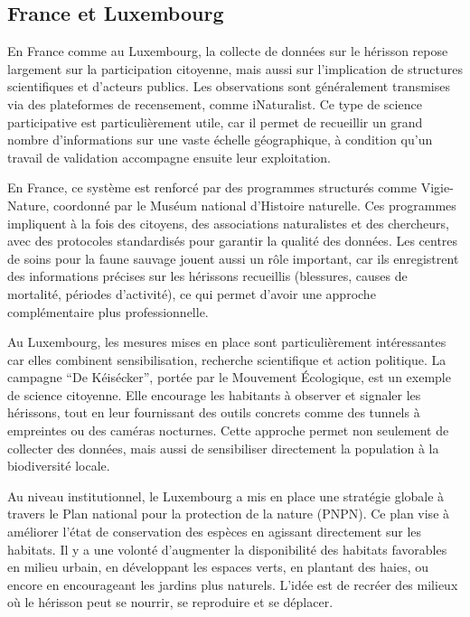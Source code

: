 \documentclass[a4paper,11pt]{article}
\begin{document}
\subsection{France et Luxembourg}

En France comme au Luxembourg, la collecte de données sur le hérisson repose largement sur la participation citoyenne, mais aussi sur l’implication de structures scientifiques et d’acteurs publics. Les observations sont généralement transmises via des plateformes de recensement, comme iNaturalist. Ce type de science participative est particulièrement utile, car il permet de recueillir un grand nombre d’informations sur une vaste échelle géographique, à condition qu’un travail de validation accompagne ensuite leur exploitation.

En France, ce système est renforcé par des programmes structurés comme Vigie-Nature, coordonné par le Muséum national d'Histoire naturelle. Ces programmes impliquent à la fois des citoyens, des associations naturalistes et des chercheurs, avec des protocoles standardisés pour garantir la qualité des données. Les centres de soins pour la faune sauvage jouent aussi un rôle important, car ils enregistrent des informations précises sur les hérissons recueillis (blessures, causes de mortalité, périodes d’activité), ce qui permet d’avoir une approche complémentaire plus professionnelle.

Au Luxembourg, les mesures mises en place sont particulièrement intéressantes car elles combinent sensibilisation, recherche scientifique et action politique. La campagne \enquote{De Kéisécker}, portée par le Mouvement Écologique, est un exemple de science citoyenne. Elle encourage les habitants à observer et signaler les hérissons, tout en leur fournissant des outils concrets comme des tunnels à empreintes ou des caméras nocturnes. Cette approche permet non seulement de collecter des données, mais aussi de sensibiliser directement la population à la biodiversité locale.

Au niveau institutionnel, le Luxembourg a mis en place une stratégie globale à travers le Plan national pour la protection de la nature (PNPN). Ce plan vise à améliorer l’état de conservation des espèces en agissant directement sur les habitats. Il y a une volonté d’augmenter la disponibilité des habitats favorables en milieu urbain, en développant les espaces verts, en plantant des haies, ou encore en encourageant les jardins plus naturels. L’idée est de recréer des milieux où le hérisson peut se nourrir, se reproduire et se déplacer.
\end{document}
